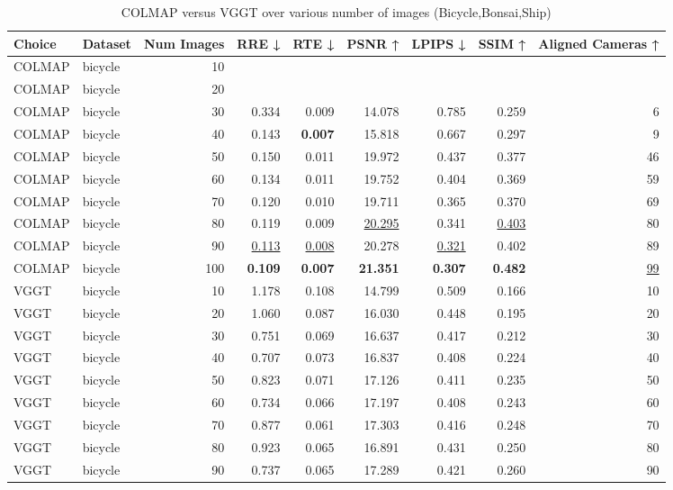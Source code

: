 \begin{table}[H]
\caption{\ifdefined\customcaption \customcaption \else COLMAP versus VGGT over various number of images (Bicycle,Bonsai,Ship) \fi}
\label{tab:01_num_images_bicycle,bonsai,ship}
\centering
\scriptsize
\begin{tabular}{llrrrrrrr}
\toprule
Choice & Dataset & Num Images & RRE ↓ & RTE ↓ & PSNR ↑ & LPIPS ↓ & SSIM ↑ & Aligned Cameras ↑ \\
\midrule
COLMAP & bicycle & 10 &  &  &  &  &  &  \\
COLMAP & bicycle & 20 &  &  &  &  &  &  \\
COLMAP & bicycle & 30 & 0.334 & 0.009 & 14.078 & 0.785 & 0.259 & 6 \\
COLMAP & bicycle & 40 & 0.143 & \textbf{0.007} & 15.818 & 0.667 & 0.297 & 9 \\
COLMAP & bicycle & 50 & 0.150 & 0.011 & 19.972 & 0.437 & 0.377 & 46 \\
COLMAP & bicycle & 60 & 0.134 & 0.011 & 19.752 & 0.404 & 0.369 & 59 \\
COLMAP & bicycle & 70 & 0.120 & 0.010 & 19.711 & 0.365 & 0.370 & 69 \\
COLMAP & bicycle & 80 & 0.119 & 0.009 & \underline{20.295} & 0.341 & \underline{0.403} & 80 \\
COLMAP & bicycle & 90 & \underline{0.113} & \underline{0.008} & 20.278 & \underline{0.321} & 0.402 & 89 \\
COLMAP & bicycle & 100 & \textbf{0.109} & \textbf{0.007} & \textbf{21.351} & \textbf{0.307} & \textbf{0.482} & \underline{99} \\
VGGT & bicycle & 10 & 1.178 & 0.108 & 14.799 & 0.509 & 0.166 & 10 \\
VGGT & bicycle & 20 & 1.060 & 0.087 & 16.030 & 0.448 & 0.195 & 20 \\
VGGT & bicycle & 30 & 0.751 & 0.069 & 16.637 & 0.417 & 0.212 & 30 \\
VGGT & bicycle & 40 & 0.707 & 0.073 & 16.837 & 0.408 & 0.224 & 40 \\
VGGT & bicycle & 50 & 0.823 & 0.071 & 17.126 & 0.411 & 0.235 & 50 \\
VGGT & bicycle & 60 & 0.734 & 0.066 & 17.197 & 0.408 & 0.243 & 60 \\
VGGT & bicycle & 70 & 0.877 & 0.061 & 17.303 & 0.416 & 0.248 & 70 \\
VGGT & bicycle & 80 & 0.923 & 0.065 & 16.891 & 0.431 & 0.250 & 80 \\
VGGT & bicycle & 90 & 0.737 & 0.065 & 17.289 & 0.421 & 0.260 & 90 \\

\end{tabular}
\end{table}
